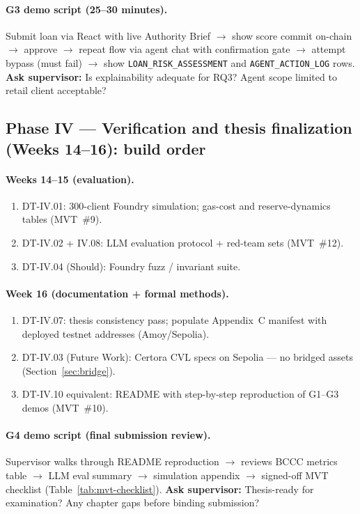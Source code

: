 \documentclass[12pt,a4paper]{report}
\begin{document}
\paragraph{G3 demo script (25--30 minutes).}
Submit loan via React with live Authority Brief $\to$ show score commit on-chain $\to$ approve $\to$ repeat flow via agent chat with confirmation gate $\to$ attempt bypass (must fail) $\to$ show \texttt{LOAN\_RISK\_ASSESSMENT} and \texttt{AGENT\_ACTION\_LOG} rows. \textbf{Ask supervisor:} Is explainability adequate for RQ3? Agent scope limited to retail client acceptable?

\subsection{Phase IV --- Verification and thesis finalization (Weeks 14--16): build order}

\paragraph{Weeks 14--15 (evaluation).}
\begin{enumerate}[noitemsep]
\item DT-IV.01: 300-client Foundry simulation; gas-cost and reserve-dynamics tables (MVT~\#9).
\item DT-IV.02 + IV.08: LLM evaluation protocol + red-team sets (MVT~\#12).
\item DT-IV.04 (Should): Foundry fuzz / invariant suite.
\end{enumerate}

\paragraph{Week 16 (documentation + formal methods).}
\begin{enumerate}[noitemsep]
\item DT-IV.07: thesis consistency pass; populate Appendix~C manifest with deployed testnet addresses (Amoy/Sepolia).
\item DT-IV.03 (Future Work): Certora CVL specs on Sepolia --- no bridged assets (Section~\ref{sec:bridge}).
\item DT-IV.10 equivalent: README with step-by-step reproduction of G1--G3 demos (MVT~\#10).
\end{enumerate}

\paragraph{G4 demo script (final submission review).}
Supervisor walks through README reproduction $\to$ reviews BCCC metrics table $\to$ LLM eval summary $\to$ simulation appendix $\to$ signed-off MVT checklist (Table~\ref{tab:mvt-checklist}). \textbf{Ask supervisor:} Thesis-ready for examination? Any chapter gaps before binding submission?
\end{document}
